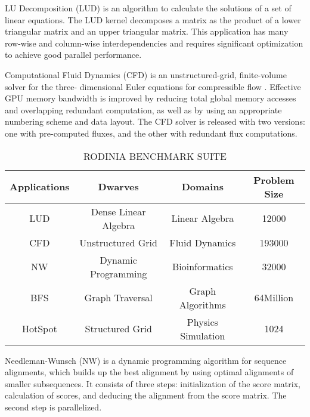   LU Decomposition (LUD) is an algorithm to calculate the solutions of a set of linear equations. The LUD kernel decomposes a matrix as the product of a lower triangular matrix and an upper triangular matrix. This application has many row-wise and column-wise interdependencies and requires significant optimization to achieve good parallel performance.



  Computational Fluid Dynamics (CFD) is an unstructured-grid, finite-volume solver for the three- dimensional Euler equations for compressible flow \cite{R:26}. Effective GPU memory bandwidth is improved by reducing total global memory accesses and overlapping redundant computation, as well as by using an appropriate numbering scheme and data layout. The CFD solver is released with two versions: one with pre-computed fluxes, and the other with redundant flux computations.


\begin{table}[htbp]
  \centering
    \caption{RODINIA BENCHMARK SUITE}
  \begin{adjustbox}{width=0.5\textwidth}
    \begin{tabular}{cccc}
    \toprule
    Applications & Dwarves & Domains & Problem Size  \\
    \midrule
    LUD & Dense Linear Algebra & Linear Algebra & 12000 \\
    CFD & Unstructured Grid & Fluid Dynamics & 193000 \\
    NW & Dynamic Programming & Bioinformatics & 32000 \\
    BFS & Graph Traversal & Graph Algorithms & 64Million \\
    HotSpot & Structured Grid & Physics Simulation & 1024 \\
    \bottomrule
    \end{tabular}%
    \label{tab:benchmarks}
  \end{adjustbox}

\end{table}%


  Needleman-Wunsch (NW) is a dynamic programming algorithm for sequence alignments, which builds up the best alignment by using optimal alignments of smaller subsequences. It consists of three steps: initialization of the score matrix, calculation of scores, and deducing the alignment from the score matrix. The second step is parallelized.

